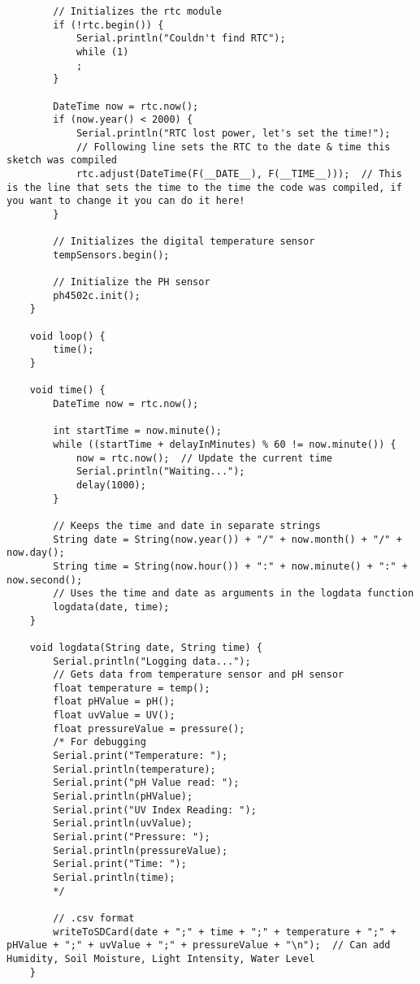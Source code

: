 \begin{lstlisting}
		// Initializes the rtc module
		if (!rtc.begin()) {
			Serial.println("Couldn't find RTC");
			while (1)
			;
		}
		
		DateTime now = rtc.now();
		if (now.year() < 2000) {
			Serial.println("RTC lost power, let's set the time!");
			// Following line sets the RTC to the date & time this sketch was compiled
			rtc.adjust(DateTime(F(__DATE__), F(__TIME__)));  // This is the line that sets the time to the time the code was compiled, if you want to change it you can do it here!
		}
		
		// Initializes the digital temperature sensor
		tempSensors.begin();
		
		// Initialize the PH sensor
		ph4502c.init();
	}
	
	void loop() {
		time();
	}
	
	void time() {
		DateTime now = rtc.now();
		
		int startTime = now.minute();
		while ((startTime + delayInMinutes) % 60 != now.minute()) {
			now = rtc.now();  // Update the current time
			Serial.println("Waiting...");
			delay(1000);
		}
		
		// Keeps the time and date in separate strings
		String date = String(now.year()) + "/" + now.month() + "/" + now.day();
		String time = String(now.hour()) + ":" + now.minute() + ":" + now.second();
		// Uses the time and date as arguments in the logdata function
		logdata(date, time);
	}
	
	void logdata(String date, String time) {
		Serial.println("Logging data...");
		// Gets data from temperature sensor and pH sensor
		float temperature = temp();
		float pHValue = pH();
		float uvValue = UV();
		float pressureValue = pressure();
		/* For debugging
		Serial.print("Temperature: ");
		Serial.println(temperature);
		Serial.print("pH Value read: ");
		Serial.println(pHValue);
		Serial.print("UV Index Reading: ");
		Serial.println(uvValue);
		Serial.print("Pressure: ");
		Serial.println(pressureValue);
		Serial.print("Time: ");
		Serial.println(time);
		*/
		
		// .csv format
		writeToSDCard(date + ";" + time + ";" + temperature + ";" + pHValue + ";" + uvValue + ";" + pressureValue + "\n");  // Can add Humidity, Soil Moisture, Light Intensity, Water Level
	}
	

\end{lstlisting}
